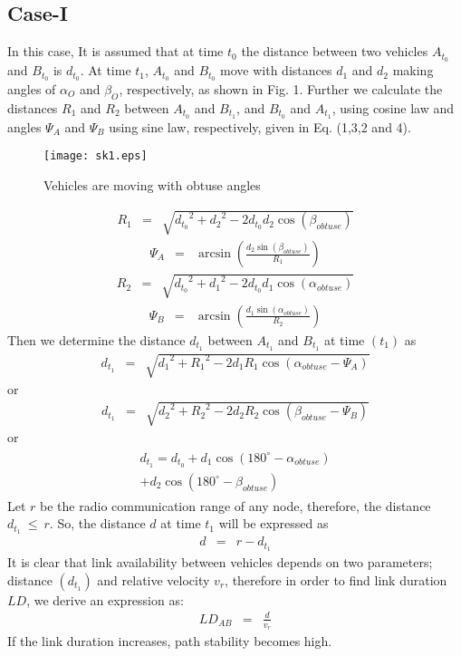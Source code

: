 \documentclass[journal]{IEEEtran}
\begin{document}
\subsection{Case-I}
In this case, It is assumed that at time $t_0$ the distance between two vehicles $A_{t_0}$ and $B_{t_0}$ is $d_{t_0}$. At time $t_1$, $A_{t_0}$ and $B_{t_0}$ move with distances $d_1$ and $d_2$ making angles of $\alpha_{O}$ and $\beta_{O}$, respectively, as shown in Fig. 1. Further we calculate the distances $R_1$ and $R_2$ between $A_{t_0}$ and $B_{t_1}$, and $B_{t_0}$ and $A_{t_1}$, using cosine law and angles $\Psi_A$ and $\Psi_B$ using sine law, respectively, given in Eq. (1,3,2 and 4).
\begin{figure}[h]
  \centering
  {\texttt{[image: sk1.eps]}}
  \caption{Vehicles are moving with obtuse angles}
\end{figure}
\begin{eqnarray}
R_{1} &=& \sqrt{{d_{t_0}}^2+{d_{2}}^2-2{d_{t_0}}{d_{2}}\cos{(\beta_{obtuse})}}
\end{eqnarray}
\begin{eqnarray}
\Psi_A &=& \arcsin{(\frac{d_2\sin{(\beta_{obtuse})}}{R_1})}
\end{eqnarray}
\begin{eqnarray}
R_{2} &=& \sqrt{{d_{t_0}}^2+{d_{1}}^2-2{d_{t_0}}{d_{1}}\cos{(\alpha_{obtuse})}}
\end{eqnarray}
\begin{eqnarray}
\Psi_B &=& \arcsin{(\frac{d_1\sin{(\alpha_{obtuse})}}{R_2})}
\end{eqnarray}
Then we determine the distance $d_{t_1}$ between $A_{t_1}$ and $B_{t_1}$ at time $(t_1)$ as
\begin{eqnarray}
d_{t_1} &=& \sqrt{{d_{1}}^2+{R_{1}}^2-2{d_{1}}{R_{1}}\cos{(\alpha_{obtuse}-\Psi_A)}}
\end{eqnarray}
or
\begin{eqnarray}
d_{t_1} &=& \sqrt{{d_{2}}^2+{R_{2}}^2-2{d_{2}}{R_{2}}\cos{(\beta_{obtuse}-\Psi_B)}}
\end{eqnarray}
or
\begin{eqnarray}
\begin{split}
d_{t_1} =  d_{t_0}+d_{1}\cos{(180^{\circ}-\alpha_{obtuse})}\\+d_{2}\cos{(180^{\circ}-\beta_{obtuse})}
\end{split}
\end{eqnarray}
Let $r$ be the radio communication range of any node, therefore, the distance $d_{t_1}~\leq~r$. So, the distance $d$ at time $t_1$ will be expressed as
\begin{eqnarray}
d &=&  r-d_{t_1}
\end{eqnarray}
It is clear that link availability between vehicles depends on two parameters; distance $(d_{t_1})$ and relative velocity $v_r$, therefore in order to find link duration $LD$, we derive an expression as:
\begin{eqnarray}
LD_{AB} &=& \frac{d}{v_r}
\end{eqnarray}
If the link duration increases, path stability becomes high.
\end{document}

